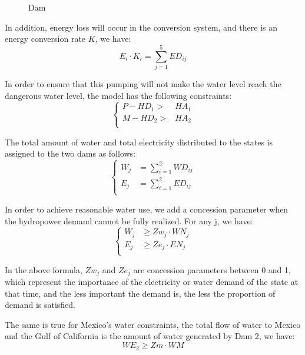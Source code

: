 \documentclass{mcmthesis}
\begin{document}
\begin{figure}[h]
	\caption{Dam}
\end{figure}

In addition, energy loss will occur in the conversion system, and there is an energy conversion rate $K$, we have:
\begin{equation}
	E_i\cdot K_i=\sum_{j=1}^{5}ED_{ij}
\end{equation}

In order to ensure that this pumping will not make the water level reach the dangerous water level, the model has the following constraints:
\begin{equation}
	\left\{ 
	\begin{aligned}
		P-HD_1>&HA_1\\
		M-HD_2>&HA_2\\
	\end{aligned}
	\right. 
\end{equation}

The total amount of water and total electricity distributed to the states is assigned to the two dams as follows:
\begin{equation}
	\left\{ 
	\begin{aligned}
		W_j&=\sum_{i=1}^{2}WD_{ij}\\
		E_j&=\sum_{i=1}^{2}ED_{ij}\\
	\end{aligned}
	\right. 
\end{equation}

In order to achieve reasonable water use, we add a concession parameter when the hydropower demand cannot be fully realized. For any j, we have:
\begin{equation}
	\left\{ 
	\begin{aligned}
		W_j&\geq Zw_j\cdot WN_{j}\\
		E_j&\geq Ze_j\cdot EN_{j}\\
	\end{aligned}
	\right. 
\end{equation}

In the above formula, $Zw_j$ and $Ze_j$ are concession parameters between 0 and 1, which represent the importance of the electricity or water demand of the state at that time, and the less important the demand is, the less the proportion of demand is satisfied.

The same is true for Mexico's water constraints, the total flow of water to Mexico and the Gulf of California is the amount of water generated by Dam 2, we have:
\begin{equation}
	WE_2\geq Zm \cdot WM
\end{equation}
\end{document}
